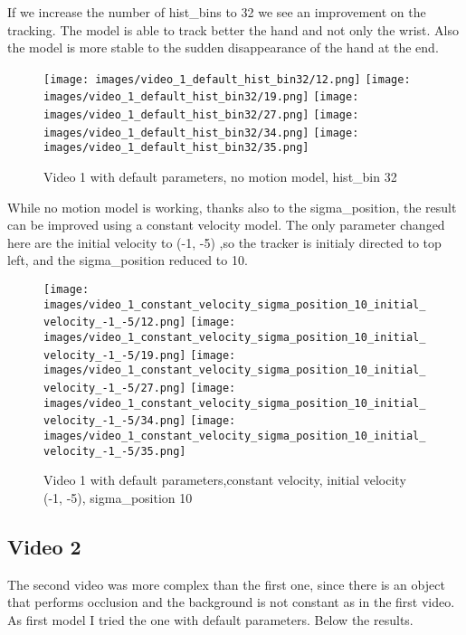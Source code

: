 \documentclass{ETHExercise}
\begin{document}
\newpage
If we increase the number of hist\_bins to 32 we see
an improvement on the tracking. The model is able to track better 
the hand and not only the wrist. Also the model is 
more stable to the sudden disappearance of the hand at the end.
\begin{figure}[!h]
    \texttt{[image: images/video\_1\_default\_hist\_bin32/12.png]}
  \endminipage
    \texttt{[image: images/video\_1\_default\_hist\_bin32/19.png]}
  \endminipage
    \texttt{[image: images/video\_1\_default\_hist\_bin32/27.png]}
  \endminipage\space
    \texttt{[image: images/video\_1\_default\_hist\_bin32/34.png]}
  \endminipage
    \texttt{[image: images/video\_1\_default\_hist\_bin32/35.png]}
  \endminipage
  \caption{Video 1 with default parameters, no motion model, hist\_bin 32}
\end{figure}

\newpage
While no motion model is working, thanks also to the sigma\_position,
the result can be improved using a constant velocity model. 
The only parameter changed here are the initial velocity to (-1, -5) 
,so the tracker is initialy directed to top left, and the sigma\_position
reduced to 10.


\begin{figure}[!h]
    \texttt{[image: images/video\_1\_constant\_velocity\_sigma\_position\_10\_initial\_velocity\_-1\_-5/12.png]}
  \endminipage
    \texttt{[image: images/video\_1\_constant\_velocity\_sigma\_position\_10\_initial\_velocity\_-1\_-5/19.png]}
  \endminipage
    \texttt{[image: images/video\_1\_constant\_velocity\_sigma\_position\_10\_initial\_velocity\_-1\_-5/27.png]}
  \endminipage\space
    \texttt{[image: images/video\_1\_constant\_velocity\_sigma\_position\_10\_initial\_velocity\_-1\_-5/34.png]}
  \endminipage
    \texttt{[image: images/video\_1\_constant\_velocity\_sigma\_position\_10\_initial\_velocity\_-1\_-5/35.png]}
  \endminipage
  \caption{Video 1 with default parameters,constant velocity, initial velocity (-1, -5), sigma\_position 10}
\end{figure}


\subsection{Video 2}
The second video was more complex than the first one, since there is 
an object that performs occlusion and the background is not constant 
as in the first video. As first model I tried the one with 
default parameters. Below the results.
\end{document}
